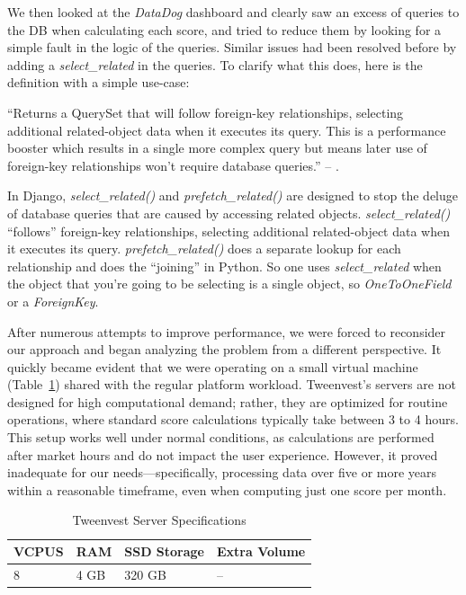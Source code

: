 \documentclass[11pt,english,a4paper,hidelinks]{book}
\begin{document}
\noindent We then looked at the \textit{DataDog} dashboard and clearly saw an excess of queries to the DB when calculating each score, and tried to reduce them by looking for a simple fault in the logic of the queries. Similar issues had been resolved before by adding a \textit{select\_related} in the queries. To clarify what this does, here is the definition with a simple use-case:

\vspace{0.5cm}
\noindent ``Returns a QuerySet that will follow foreign-key relationships, selecting additional related-object data when it executes its query. This is a performance booster which results in a single more complex query but means later use of foreign-key relationships won't require database queries.'' -- \textcite{django2025selectrelated}.

\vspace{0.5cm}
\noindent In Django, \textit{select\_related()} and \textit{prefetch\_related()} are designed to stop the deluge of database queries that are caused by accessing related objects. \textit{select\_related()} ``follows'' foreign-key relationships, selecting additional related-object data when it executes its query. \textit{prefetch\_related()} does a separate lookup for each relationship and does the ``joining'' in Python. So one uses \textit{select\_related} when the object that you're going to be selecting is a single object, so \textit{OneToOneField} or a \textit{ForeignKey}.

\vspace{0.5cm}
\noindent After numerous attempts to improve performance, we were forced to reconsider our approach and began analyzing the problem from a different perspective. It quickly became evident that we were operating on a small virtual machine (Table~\ref{tab:tweenvest_server_specs}) shared with the regular platform workload. Tweenvest’s servers are not designed for high computational demand; rather, they are optimized for routine operations, where standard score calculations typically take between 3 to 4 hours. This setup works well under normal conditions, as calculations are performed after market hours and do not impact the user experience. However, it proved inadequate for our needs—specifically, processing data over five or more years within a reasonable timeframe, even when computing just one score per month.

\begin{table}[H]
    \centering
    \begin{tabular}{|l|l|l|l|}
        \hline
        \textbf{VCPUS} & \textbf{RAM} & \textbf{SSD Storage} & \textbf{Extra Volume} \\
        \hline
        8 & 4 GB & 320 GB & -- \\
        \hline
    \end{tabular}
    \caption{Tweenvest Server Specifications}
    \label{tab:tweenvest_server_specs}
\end{table}
\end{document}
